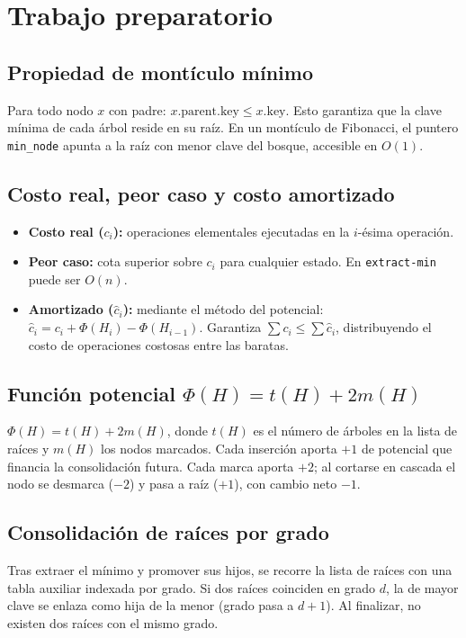 \section{Trabajo preparatorio}

\subsection{Propiedad de montículo mínimo}
Para todo nodo $x$ con padre: $x.\text{parent}.\text{key} \le x.\text{key}$. Esto garantiza que la clave mínima de cada árbol reside en su raíz. En un montículo de Fibonacci, el puntero \texttt{min\_node} apunta a la raíz con menor clave del bosque, accesible en $O(1)$.

\subsection{Costo real, peor caso y costo amortizado}
\begin{itemize}
    \item \textbf{Costo real ($c_i$):} operaciones elementales ejecutadas en la $i$-ésima operación.
    \item \textbf{Peor caso:} cota superior sobre $c_i$ para cualquier estado. En \texttt{extract-min} puede ser $O(n)$.
    \item \textbf{Amortizado ($\hat{c}_i$):} mediante el método del potencial:
    $\hat{c}_i = c_i + \Phi(H_i) - \Phi(H_{i-1})$.
    Garantiza $\sum c_i \le \sum \hat{c}_i$, distribuyendo el costo de operaciones costosas entre las baratas.
\end{itemize}

\subsection{Función potencial \texorpdfstring{$\Phi(H) = t(H) + 2m(H)$}{Phi(H) = t(H) + 2m(H)}}
$\Phi(H) = t(H) + 2m(H)$, donde $t(H)$ es el número de árboles en la lista de raíces y $m(H)$ los nodos marcados. Cada inserción aporta $+1$ de potencial que financia la consolidación futura. Cada marca aporta $+2$; al cortarse en cascada el nodo se desmarca ($-2$) y pasa a raíz ($+1$), con cambio neto $-1$.

\subsection{Consolidación de raíces por grado}
Tras extraer el mínimo y promover sus hijos, se recorre la lista de raíces con una tabla auxiliar indexada por grado. Si dos raíces coinciden en grado $d$, la de mayor clave se enlaza como hija de la menor (grado pasa a $d+1$). Al finalizar, no existen dos raíces con el mismo grado.

